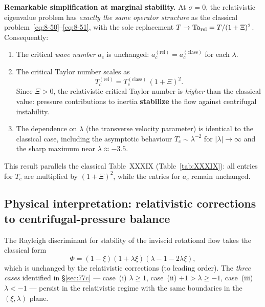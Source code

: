 \begin{relcorrection}
\textbf{Remarkable simplification at marginal stability.}
At $\sigma = 0$, the relativistic eigenvalue problem has
\emph{exactly the same operator structure} as the classical
problem~\eqref{eq:8-50}--\eqref{eq:8-51}, with the sole replacement
$T \to \mathrm{Ta}_{\mathrm{rel}} = T/(1+\Xi)^2$.  Consequently:
\begin{enumerate}
\item The critical \emph{wave number} $a_c$ is unchanged:
  $a_c^{\mathrm{(rel)}} = a_c^{\mathrm{(class)}}$ for each $\lambda$.
\item The critical Taylor number scales as
  \begin{equation}
  \label{eq:rel-8-Tc-scaling}
  T_c^{\mathrm{(rel)}} = T_c^{\mathrm{(class)}}\,(1+\Xi)^2.
  \end{equation}
  Since $\Xi > 0$, the relativistic critical Taylor number is
  \emph{higher} than the classical value: pressure contributions to
  inertia \textbf{stabilize} the flow against centrifugal instability.
\item The dependence on $\lambda$ (the transverse velocity parameter)
  is identical to the classical case, including the asymptotic
  behaviour $T_c \sim \lambda^{-2}$ for $|\lambda| \to \infty$
  and the sharp maximum near $\lambda \approx -3.5$.
\end{enumerate}
This result parallels the classical Table~XXXIX (Table~\ref{tab:XXXIX}):
all entries for $T_c$ are multiplied by $(1+\Xi)^2$, while the entries
for $a_c$ remain unchanged.
\end{relcorrection}

\subsection{Physical interpretation: relativistic corrections to
  centrifugal-pressure balance}
\label{sec:rel-77c}

The Rayleigh discriminant for stability of the inviscid rotational
flow takes the classical form
\begin{equation}
\label{eq:rel-8-53}
\Phi = (1-\xi)(1+\lambda\xi)(\lambda - 1 - 2\lambda\xi),
\end{equation}
which is unchanged by the relativistic corrections (to leading order).
The \emph{three cases} identified in \S\ref{sec:77c} ---
case~(i) $\lambda \geqslant 1$,
case~(ii) $+1 > \lambda \geqslant -1$,
case~(iii) $\lambda < -1$ ---
persist in the relativistic regime with the same boundaries in the
$(\xi, \lambda)$ plane.

